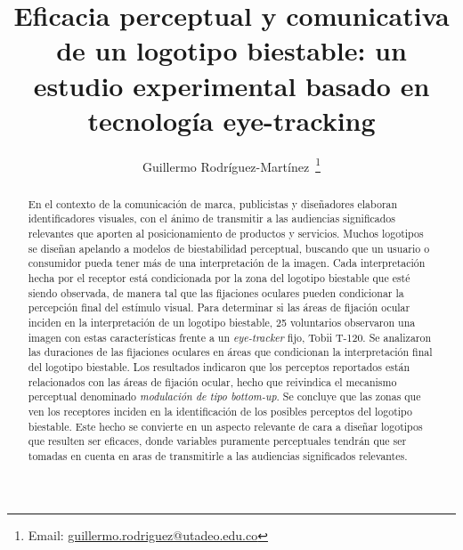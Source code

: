 \documentclass[spanish]{textolivre}
\title{Eficacia perceptual y comunicativa de un logotipo biestable: un estudio experimental basado en tecnología eye-tracking}
\author[1]{Guillermo Rodríguez-Martínez~\orcid{0000-0003-4329-5745}\thanks{Email: \href{mailto:guillermo.rodriguez@utadeo.edu.co}{guillermo.rodriguez@utadeo.edu.co}}}
\affil[1]{Universidad de Bogotá Jorge Tadeo Lozano, Bogotá, Colombia.}
\begin{document}
\maketitle
\begin{polyabstract}
\begin{abstract}
En el contexto de la comunicación de marca, publicistas y diseñadores elaboran identificadores visuales, con el ánimo de transmitir a las audiencias significados relevantes que aporten al posicionamiento de productos y servicios. Muchos logotipos se diseñan apelando a modelos de biestabilidad perceptual, buscando que un usuario o consumidor pueda tener más de una interpretación de la imagen. Cada interpretación hecha por el receptor está condicionada por la zona del logotipo biestable que esté siendo observada, de manera tal que las fijaciones oculares pueden condicionar la percepción final del estímulo visual. Para determinar si las áreas de fijación ocular inciden en la interpretación de un logotipo biestable, 25 voluntarios observaron una imagen con estas características frente a un \textit{eye-tracker} fijo, Tobii T-120. Se analizaron las duraciones de las fijaciones oculares en áreas que condicionan la interpretación final del logotipo biestable. Los resultados indicaron que los perceptos reportados están relacionados con las áreas de fijación ocular, hecho que reivindica el mecanismo perceptual denominado \textit{modulación de tipo bottom-up}. Se concluye que las zonas que ven los receptores inciden en la identificación de los posibles perceptos del logotipo biestable. Este hecho se convierte en un aspecto relevante de cara a diseñar logotipos que resulten ser eficaces, donde variables puramente perceptuales tendrán que ser tomadas en cuenta en aras de transmitirle a las audiencias significados relevantes.

\end{abstract}


\end{polyabstract}
\end{document}

